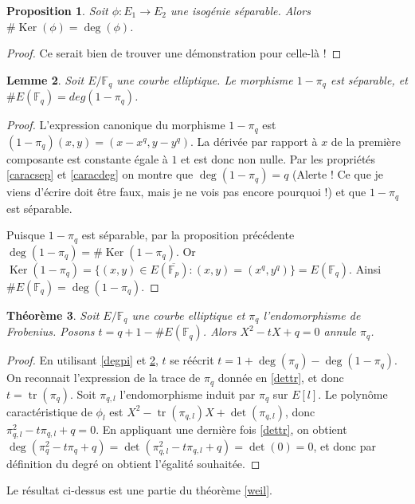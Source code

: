 \documentclass{article}
\theoremstyle{plain}%
\newtheorem{thm}{Théorème}[section]
\newtheorem{prop}[thm]{Proposition}
\newtheorem{lem}[thm]{Lemme}
\theoremstyle{definition}%
\newcommand{\F}{\mathbb{F}}
\DeclareMathOperator{\tr}{tr}
\DeclareMathOperator{\Ker}{Ker}
\begin{document}
\begin{prop}
  Soit $\phi:E_1\to E_2$ une isogénie séparable. Alors $\# \Ker(\phi) = \deg(\phi)$.  
\end{prop}

\begin{proof}
  {\color{red} Ce serait bien de trouver une démonstration pour celle-là !}
\end{proof}

\begin{lem}
  \label{cardpi}
  Soit $E/\F_q$ une courbe elliptique. Le morphisme $1-\pi_q$ est séparable, et $\#E(\F_q) = deg(1 - \pi_q)$.
\end{lem}

\begin{proof}
  L'expression canonique du morphisme $1-\pi_q$ est $(1-\pi_q)(x, y) = (x-x^q, y-y^q)$. La dérivée par rapport à $x$ de la première composante est constante égale à $1$ et est donc non nulle. Par les propriétés \ref{caracsep} et \ref{caracdeg} on montre que $\deg(1-\pi_q) = q$ {\color{red} (Alerte ! Ce que je viens d'écrire doit être faux, mais je ne vois pas encore pourquoi !)} et que $1-\pi_q$ est séparable.

  Puisque $1-\pi_q$ est séparable, par la proposition précédente $\deg(1-\pi_q) = \# \Ker(1-\pi_q)$. Or $\Ker(1-\pi_q) = \{(x, y) \in E(\overline{\F_p}) : (x, y) = (x^q, y^q) \} = E(\F_q)$. Ainsi $\# E(\F_q) = \deg(1-\pi_q)$.
\end{proof}

\begin{thm}
  \label{polcarac}
  Soit $E/\F_q$ une courbe elliptique et $\pi_q$ l'endomorphisme de Frobenius. Posons $t=q+1-\#E(\F_q)$. Alors $X^2 -tX + q = 0$ annule $\pi_q$.
\end{thm}

\begin{proof}
  En utilisant \ref{degpi} et \ref{cardpi}, $t$ se réécrit $t = 1 + \deg(\pi_q) - \deg(1-\pi_q)$. On reconnait l'expression de la trace de $\pi_q$ donnée en \ref{dettr}, et donc $t = \tr(\pi_q)$. Soit $\pi_{q, l}$ l'endomorphisme induit par $\pi_q$ sur $E[l]$. Le polynôme caractéristique de $\phi_l$ est $X^2 -\tr(\pi_{q,l}) X + \det(\pi_{q, l})$, donc $\pi_{q,l}^2 - t\pi_{q,l}+q = 0$. En appliquant une dernière fois \ref{dettr}, on obtient $\deg(\pi_{q}^2 - t\pi_{q}+q ) = \det (\pi_{q,l}^2 - t\pi_{q,l}+q ) = \det(0) = 0$, et donc par définition du degré on obtient l'égalité souhaitée.
\end{proof}

Le résultat ci-dessus est une partie du théorème \ref{weil}.
\end{document}
